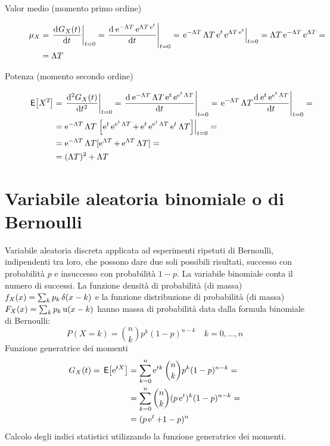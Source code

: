 \begin{description}
\item[Valor medio (momento primo ordine)]
\begin{equation}\begin{split}\mu_X&=\restrict{\deriv{G_X(t)}{t}}{t=0}=\restrict{\deriv{\e{-\Lambda T}\e{\Lambda T\e{t}}}{t}}{t=0}=\restrict{\e{-\Lambda T}{\Lambda T}\e{t}\e{\Lambda T\e{t}}}{t=0}=\Lambda T \e{-\Lambda T}\e{\Lambda T}=\\&=\Lambda T\end{split}\end{equation}

\item[Potenza (momento secondo ordine)]
\begin{equation}\begin{split}\E{X^2}&=\restrict{\deriv[2]{G_X(t)}{t}}{t=0}=
\restrict{\deriv{\e{-\Lambda T}{\Lambda T}\e{t}\e{\e{t}\Lambda T}}{t}}{t=0}=
\restrict{\e{-\Lambda T}{\Lambda T}\deriv{\e{t}\e{\e{t}\Lambda T}}{t}}{t=0}=\\
&={\e{-\Lambda T}\Lambda T}\restrict{\left[\e{t}\e{\e{t}\Lambda T}+\e{t}\e{\e{t}\Lambda T}{\e{t}\Lambda T}\right]}{t=0}=\\
&={\e{-\Lambda T}\Lambda T}[\e{\Lambda T}+\e{\Lambda T}{\Lambda T}]=\\&=(\Lambda T)^2+\Lambda T
\end{split}\end{equation}
\end{description}

\section{Variabile aleatoria binomiale o di Bernoulli}
Variabile aleatoria discreta applicata ad esperimenti ripetuti di Bernoulli, indipendenti tra loro, che possono dare due soli possibili risultati, successo con probabilità $p$ e insuccesso con probabilità $1-p$. La variabile binomiale conta il numero di successi.
La funzione densità di probabilità (di massa) $f_X(x)=\sum_k p_k \impulse(x-k)$ e la funzione distribuzione di probabilità (di massa) $F_X(x)=\sum_k p_k \step(x-k)$ hanno massa di probabilità data dalla formula binomiale di Bernoulli:
\begin{equation}
P(X=k)=\binom{n}{k} p^k (1-p)^{n-k}\quad k=0,\dots,n
\end{equation}
Funzione generatrice dei momenti
\begin{equation}\begin{split}G_X(t)=\E{\e{t X}}&=\sum_{k=0}^{n}{\e{t k}\binom{n}{k}p^k(1-p)^{n-k}}=\\&=\sum_{k=0}^{n}{\binom{n}{k}(p\e{t})^k(1-p)^{n-k}}=\\
&=(p\e{t}+1-p)^n\end{split}\end{equation}
Calcolo degli indici statistici utilizzando la funzione generatrice dei momenti.\\

